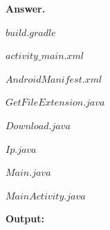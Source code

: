 \documentclass{article}
\begin{document}
\pagebreak
\begin{flushleft}
\textbf{Answer.}

\textbf{$build.gradle$}

\textbf{$activity\_main.xml$}

\textbf{$AndroidManifest.xml$}

\textbf{$GetFileExtension.java$}

\textbf{$Download.java$}

\textbf{$Ip.java$}

\textbf{$Main.java$}

\textbf{$MainActivity.java$}

\end{flushleft}

\textbf{Output:}
\end{document}

